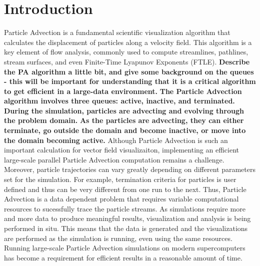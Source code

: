 \documentclass{IEEEtran}
\begin{document}
\section{Introduction}
%
Particle Advection is a fundamental scientific visualization algorithm that calculates the displacement of particles along a velocity field. 
%
This algorithm is a key element of flow analysis, commonly used to compute streamlines, pathlines, stream surfaces, and even Finite-Time Lyapunov Exponents (FTLE).
%
\textbf{Describe the PA algorithm a little bit, and give some background on the queues - this will be important for understanding that it is a critical algorithm to get efficient in a large-data environment.}
%
\textbf{The Particle Advection algorithm involves three queues: active, inactive, and terminated.}
%
\textbf{During the simulation, particles are advecting and evolving through the problem domain.}
%
\textbf{As the particles are advecting, they can either terminate, go outside the domain and become inactive, or move into the domain becoming active.}
%
Although Particle Advection is such an important calculation for vector field visualizaiton, implementing an efficient large-scale parallel Particle Advection computation remains a challenge.
%
Moreover, particle trajectories can vary greatly depending on different parameters set for the simulation.
%
For example, termination criteria for particles is user defined and thus can be very different from one run to the next.
%
Thus, Particle Advection is a data dependent problem that requires variable computational resources to sucessfully trace the particle streams.
%
As simulations require more and more data to produce meaningful results, visualization and analysis is being performed in situ.
%
This means that the data is generated and the visualizations are performed as the simulation is running, even using the same resources.
%
Running large-scale Particle Advection simulations on modern supercomputers has become a requirement for efficient results in a reasonable amount of time.
\end{document}
